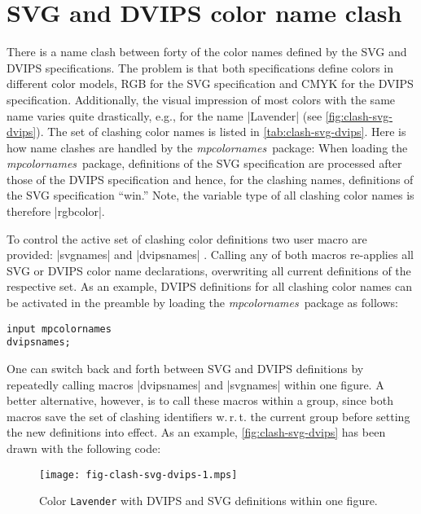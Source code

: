 \documentclass[DIV=9, captions=tableheading]{scrartcl}
\newcommand*{\name}[1]{\textsf{\mdseries\emph{#1}}}
\newcommand*{\pkg}{\name{mpcolornames}}
\newcommand*{\macro}[1]{%
  \marginpar{%
    \hspace*{-\marginparsep}%
    \hspace*{-\textwidth}%
    \hspace*{-\marginparsep}%
    \hspace*{-\marginparwidth}%
    \makebox[\marginparwidth][r]{%
      \color{mpcolor}%
      \texttt{#1}%
    }%
  }%
}
\begin{document}
\section{SVG and DVIPS color name clash}
\label{sec:nameclash}
There is a name clash between forty of the color names defined by the
SVG and DVIPS specifications.  The problem is that both specifications
define colors in different color models, RGB for the SVG specification
and CMYK for the DVIPS specification.  Additionally, the visual
impression of most colors with the same name varies quite drastically,
e.g., for the name |Lavender| (see \autoref{fig:clash-svg-dvips}).  The
set of clashing color names is listed in \autoref{tab:clash-svg-dvips}.
Here is how name clashes are handled by the \pkg\ package: When loading
the \pkg\ package, definitions of the SVG specification are processed
after those of the DVIPS specification and hence, for the clashing
names, definitions of the SVG specification ``win.''  Note, the variable
type of all clashing color names is therefore |rgbcolor|.

To control the active set of clashing color definitions two user macro
are provided: |svgnames|\macro{svgnames} and
|dvipsnames|\macro{dvipsnames}.  Calling any of both macros re-applies
all SVG or DVIPS color name declarations, overwriting all current
definitions of the respective set.  As an example, DVIPS definitions for
all clashing color names can be activated in the preamble by loading the
\pkg\ package as follows:

\begin{lstlisting}[style=MP]
input mpcolornames
dvipsnames;
\end{lstlisting}

One can switch back and forth between SVG and DVIPS definitions by
repeatedly calling macros |dvipsnames| and |svgnames| within one figure.
A better alternative, however, is to call these macros within a group,
since both macros save the set of clashing identifiers w.\,r.\,t. the
current group before setting the new definitions into effect.  As an
example, \autoref{fig:clash-svg-dvips} has been drawn with the following
code:



\begin{figure}
  \centering
  \texttt{[image: fig-clash-svg-dvips-1.mps]}
  \caption{Color \texttt{\color{mpcolor}Lavender} with DVIPS and SVG
    definitions within one figure.}
  \label{fig:clash-svg-dvips}
\end{figure}
\end{document}
